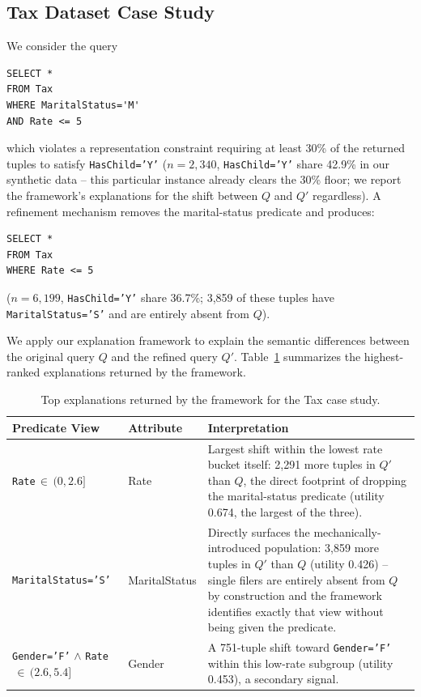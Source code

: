\subsection{Tax Dataset Case Study}
\label{subsec:tax-case-study}

We consider the query
\begin{verbatim}
SELECT *
FROM Tax
WHERE MaritalStatus='M'
AND Rate <= 5
\end{verbatim}
which violates a representation constraint requiring at least
30\% of the returned tuples to satisfy \texttt{HasChild='Y'}
($n{=}2{,}340$, \texttt{HasChild='Y'} share 42.9\% in our synthetic data --
this particular instance already clears the 30\% floor; we report the
framework's explanations for the shift between $Q$ and $Q'$ regardless).
A refinement mechanism removes the marital-status predicate and
produces:
\begin{verbatim}
SELECT *
FROM Tax
WHERE Rate <= 5
\end{verbatim}
($n{=}6{,}199$, \texttt{HasChild='Y'} share 36.7\%; 3{,}859 of these
tuples have \texttt{MaritalStatus='S'} and are entirely absent from $Q$).

We apply our explanation framework to explain the semantic
differences between the original query $Q$ and the refined query
$Q'$. Table~\ref{tab:tax-explanations} summarizes the highest-ranked
explanations returned by the framework.

\begin{table}[t]
\centering
\small
\begin{tabular}{p{2.7cm}p{1.6cm}p{3.3cm}}
\hline
Predicate View & Attribute & Interpretation \\
\hline
\texttt{Rate}$\,\in\,(0,2.6]$
&
Rate
&
Largest shift within the lowest rate bucket itself: 2{,}291 more tuples
in $Q'$ than $Q$, the direct footprint of dropping the marital-status
predicate (utility 0.674, the largest of the three).
\\
\texttt{MaritalStatus='S'}
&
MaritalStatus
&
Directly surfaces the mechanically-introduced population: 3{,}859 more
tuples in $Q'$ than $Q$ (utility 0.426) -- single filers are entirely
absent from $Q$ by construction and the framework identifies exactly
that view without being given the predicate.
\\
\texttt{Gender='F'} $\wedge$ \texttt{Rate}$\,\in\,(2.6,5.4]$
&
Gender
&
A 751-tuple shift toward \texttt{Gender='F'} within this low-rate
subgroup (utility 0.453), a secondary signal.
\\
\hline
\end{tabular}
\caption{Top explanations returned by the framework for the Tax case study.}
\label{tab:tax-explanations}
\end{table}

